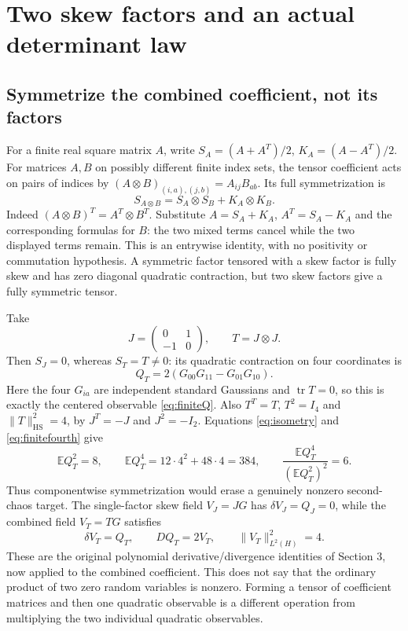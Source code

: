 \documentclass[11pt]{article}
\newcommand{\E}{\mathbb E}
\newcommand{\HS}{\mathrm{HS}}
\newcommand{\tr}{\operatorname{tr}}
\begin{document}
\section{Two skew factors and an actual determinant law}
\subsection{Symmetrize the combined coefficient, not its factors}
For a finite real square matrix $A$, write
$S_A=(A+A^T)/2$, $K_A=(A-A^T)/2$. For matrices $A,B$ on
possibly different finite index sets, the tensor coefficient acts on
pairs of indices by $(A\otimes B)_{(i,a),(j,b)}=A_{ij}B_{ab}$.
Its full symmetrization is
\begin{equation}\label{eq:tensorsymmetry}
 S_{A\otimes B}=S_A\otimes S_B+K_A\otimes K_B.
\end{equation}
Indeed $(A\otimes B)^T=A^T\otimes B^T$. Substitute
$A=S_A+K_A$, $A^T=S_A-K_A$ and the corresponding formulas
for $B$: the two mixed terms cancel while the two displayed
terms remain. This is an entrywise identity, with no positivity
or commutation hypothesis. A symmetric factor tensored with a
skew factor is fully skew and has zero diagonal quadratic
contraction, but two skew factors give a fully symmetric tensor.

Take
\[
 J=\begin{pmatrix}0&1\\-1&0\end{pmatrix},\qquad T=J\otimes J.
\]
Then $S_J=0$, whereas $S_T=T\ne0$: its quadratic contraction
on four coordinates is
\begin{equation}\label{eq:detobservable}
 Q_T=2(G_{00}G_{11}-G_{01}G_{10}).
\end{equation}
Here the four $G_{ia}$ are independent standard Gaussians and
$\tr T=0$, so this is exactly the centered observable
\eqref{eq:finiteQ}. Also $T^T=T$, $T^2=I_4$ and
$\|T\|_\HS^2=4$, by $J^T=-J$ and $J^2=-I_2$.
Equations \eqref{eq:isometry} and \eqref{eq:finitefourth} give
\[
 \E Q_T^2=8,\qquad \E Q_T^4=12\cdot4^2+48\cdot4=384,
 \qquad \frac{\E Q_T^4}{(\E Q_T^2)^2}=6.
\]
Thus componentwise symmetrization would erase a genuinely nonzero
second-chaos target. The single-factor skew field $V_J=JG$ has
$\delta V_J=Q_J=0$, while the combined field $V_T=TG$ satisfies
\[
 \delta V_T=Q_T,\qquad DQ_T=2V_T,\qquad \|V_T\|_{L^2(H)}^2=4.
\]
These are the original polynomial derivative/divergence identities
of Section 3, now applied to the combined coefficient. This does
not say that the ordinary product of two zero random variables
is nonzero. Forming a tensor of coefficient matrices and then
one quadratic observable is a different operation from multiplying
the two individual quadratic observables.
\end{document}
